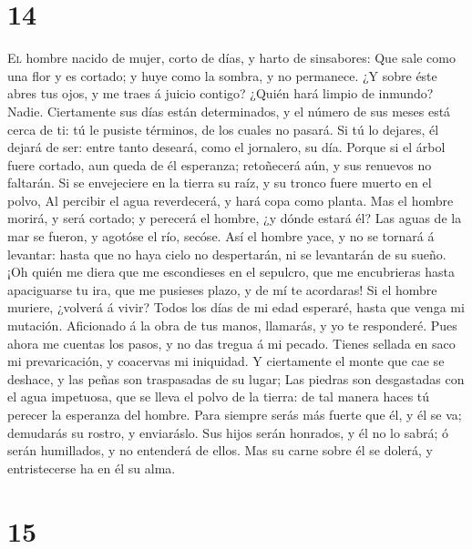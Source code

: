 \hypertarget{section-13}{%
\section{14}\label{section-13}}

 \textsc{El} hombre nacido de mujer, corto de días, y
harto de sinsabores:  Que sale como una flor y es cortado;
y huye como la sombra, y no permanece.  ¿Y sobre éste
abres tus ojos, y me traes á juicio contigo?  ¿Quién hará
limpio de inmundo? Nadie.  Ciertamente sus días están
determinados, y el número de sus meses está cerca de ti: tú le pusiste
términos, de los cuales no pasará.  Si tú lo dejares, él
dejará de ser: entre tanto deseará, como el jornalero, su día.
 Porque si el árbol fuere cortado, aun queda de él
esperanza; retoñecerá aún, y sus renuevos no faltarán.  Si
se envejeciere en la tierra su raíz, y su tronco fuere muerto en el
polvo,  Al percibir el agua reverdecerá, y hará copa como
planta.  Mas el hombre morirá, y será cortado; y perecerá
el hombre, ¿y dónde estará él?  Las aguas de la mar se
fueron, y agotóse el río, secóse.  Así el hombre yace, y
no se tornará á levantar: hasta que no haya cielo no despertarán, ni se
levantarán de su sueño.  ¡Oh quién me diera que me
escondieses en el sepulcro, que me encubrieras hasta apaciguarse tu ira,
que me pusieses plazo, y de mí te acordaras!  Si el
hombre muriere, ¿volverá á vivir? Todos los días de mi edad esperaré,
hasta que venga mi mutación.  Aficionado á la obra de tus
manos, llamarás, y yo te responderé.  Pues ahora me
cuentas los pasos, y no das tregua á mi pecado.  Tienes
sellada en saco mi prevaricación, y coacervas mi iniquidad.
 Y ciertamente el monte que cae se deshace, y las peñas
son traspasadas de su lugar;  Las piedras son desgastadas
con el agua impetuosa, que se lleva el polvo de la tierra: de tal manera
haces tú perecer la esperanza del hombre.  Para siempre
serás más fuerte que él, y él se va; demudarás su rostro, y enviaráslo.
 Sus hijos serán honrados, y él no lo sabrá; ó serán
humillados, y no entenderá de ellos.  Mas su carne sobre
él se dolerá, y entristecerse ha en él su alma.

\hypertarget{section-14}{%
\section{15}\label{section-14}}

